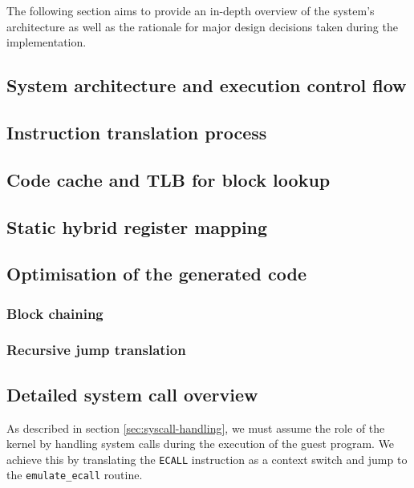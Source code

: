 The following section aims to provide an in-depth overview of the system's architecture as well as the rationale for major design decisions taken during the implementation.

\subsection{System architecture and execution control flow}

\subsection{Instruction translation process}

\subsection{Code cache and TLB for block lookup}

\subsection{Static hybrid register mapping}

\subsection{Optimisation of the generated code}
\subsubsection{Block chaining}
\subsubsection{Recursive jump translation}

\subsection{Detailed system call overview}

As described in section \vref{sec:syscall-handling}, we must assume the role of the kernel by handling system calls during the execution of the guest program.
We achieve this by translating the \texttt{ECALL} instruction as a context switch and jump to the \texttt{emulate\_ecall} routine.

